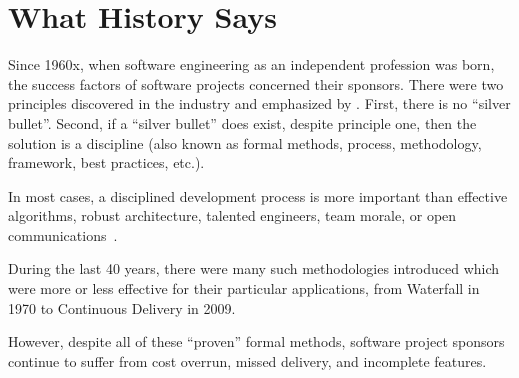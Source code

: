 \documentclass[12pt,letterpaper,oneside]{article}
\newcommand{\enru}[2]{#1}
\begin{document}
\addcontentsline{toc}{section}{\enru{What History Says}{Что говорит опыт?}}
\section*{\enru{What History Says}{Что говорит опыт?}}

    \enru{
        Since 1960x, when software engineering as an independent profession was born,
        the success factors of software projects concerned their sponsors.
        There were two principles discovered in the industry and emphasized
        by \citet{brooks95}.
        First, there is no ``silver bullet''. Second,
        if a ``silver bullet'' does exist, despite principle
        one, then the solution is a discipline
        (also known as formal methods, process, methodology,
        framework, best practices, etc.).
    }{
        Начиная с 60-х годов, когда ``software engineering'' появилась
        как самостоятельная профессия, многие пытаются найти формулу успеха
        для проектов по разработке
        программного обеспечения. \citet{brooks95}
        высказал две важные мысли. Во-первых, универсальной формулы нет.
        Во-вторых, если она и есть, то это дисциплина, также известная
        как формальная методика, процесс, методология, правила работы и пр.)
    }

    \marginnote{\color{tpcBlack}}
    \enru{
        In most cases, a disciplined development process is
        more important than effective algorithms,
        robust architecture, talented engineers,
        team morale, or open communications~\citep{davies02,emam08,sauser09}.
    }{
        Как показывают исследования, в большинстве случаев
        дисциплинированный процесс значительно важнее правильных
        алгоритмов, цельной архитектуры, талантливых инженеров,
        мотивации и открытых коммуникаций~\citep{davies02,emam08,sauser09}.
    }

    \enru{
        During the last 40 years, there were many such methodologies introduced which were
        more or less effective for their particular applications,
        from Waterfall in 1970 to Continuous Delivery in 2009.
    }{
        В течение последних 40-ка лет множество методологий
        было предложено, более или менее эффективных в тех
        или иных приложениях. От ``водопадного процесса'' до
        ``непрерывной доставки''.
    }

    \enru{
        However, despite all of these ``proven'' formal methods,
        software project sponsors continue to suffer from
        cost overrun, missed delivery, and incomplete features.
    }{
        Однако, вопреки всем этим разработкам заказчики
        продолжают терпеть убытки, срывать сроки
        и получать некачественные продукты.
    }
\end{document}
